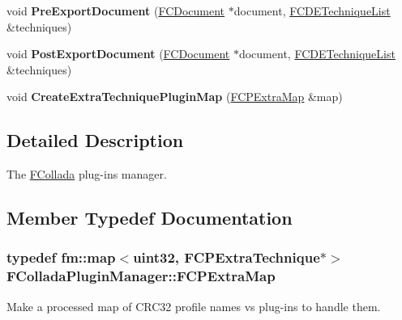 \begin{DoxyCompactItemize}
\item 
\hypertarget{classFColladaPluginManager_aba08d84d5152c8b33c15381a64f5a9bb}{
void {\bfseries PreExportDocument} (\hyperlink{classFCDocument}{FCDocument} $\ast$document, \hyperlink{classfm_1_1pvector}{FCDETechniqueList} \&techniques)}
\label{classFColladaPluginManager_aba08d84d5152c8b33c15381a64f5a9bb}

\item 
\hypertarget{classFColladaPluginManager_ab8bb786e9ef6f148169c0c23cd32087e}{
void {\bfseries PostExportDocument} (\hyperlink{classFCDocument}{FCDocument} $\ast$document, \hyperlink{classfm_1_1pvector}{FCDETechniqueList} \&techniques)}
\label{classFColladaPluginManager_ab8bb786e9ef6f148169c0c23cd32087e}

\item 
\hypertarget{classFColladaPluginManager_a50d43e3f951e3be7a071b212641ea3e1}{
void {\bfseries CreateExtraTechniquePluginMap} (\hyperlink{classfm_1_1map}{FCPExtraMap} \&map)}
\label{classFColladaPluginManager_a50d43e3f951e3be7a071b212641ea3e1}

\end{DoxyCompactItemize}


\subsection{Detailed Description}
The \hyperlink{namespaceFCollada}{FCollada} plug-\/ins manager. 

\subsection{Member Typedef Documentation}
\hypertarget{classFColladaPluginManager_a31b0354a9ddff1b9f6eb4543662bbed8}{
\subsubsection[{FCPExtraMap}]{\setlength{\rightskip}{0pt plus 5cm}typedef {\bf fm::map}$<$uint32, {\bf FCPExtraTechnique}$\ast$$>$ {\bf FColladaPluginManager::FCPExtraMap}}}
\label{classFColladaPluginManager_a31b0354a9ddff1b9f6eb4543662bbed8}
Make a processed map of CRC32 profile names vs plug-\/ins to handle them. 

